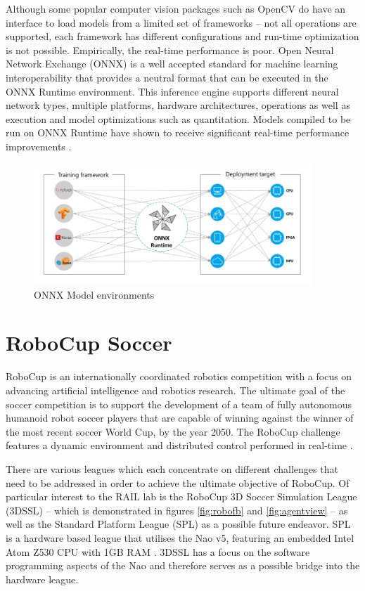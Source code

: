 \documentclass[a4paper,twoside,12pt]{report}
\begin{document}
Although some popular computer vision packages such as OpenCV do have an interface to load models from a limited set of frameworks -- not all operations are supported, each framework has different configurations and run-time optimization is not possible. Empirically, the real-time performance is poor. Open Neural Network Exchange (ONNX) is a well accepted standard \citep{onnx} for machine learning interoperability that provides a neutral format that can be executed in the ONNX Runtime environment. This inference engine supports different neural network types, multiple platforms, hardware architectures, operations as well as execution and model optimizations such as quantitation. Models compiled to be run on ONNX Runtime have shown to receive significant real-time performance improvements \citep{inference}.

\begin{figure}[h!]
\begin{center}
\includegraphics[width=10.5cm]{images/onnx.jpg}
\caption{ONNX Model environments \citep{onnx}}
\label{fig:onnxplot}
\end{center}
\end{figure}

\section{RoboCup Soccer}
RoboCup is an internationally coordinated robotics competition with a focus on advancing artificial intelligence and robotics research. The ultimate goal of the soccer competition is to support the development of a team of fully autonomous humanoid robot soccer players that are capable of winning against the winner of the most recent soccer World Cup, by the year 2050. The RoboCup challenge features a dynamic environment and distributed control performed in real-time \citep{RoboCupObj}.\

There are various leagues which each concentrate on different challenges that need to be addressed in order to achieve the ultimate objective of RoboCup. Of particular interest to the RAIL lab is the RoboCup 3D Soccer Simulation League (3DSSL) -- which is demonstrated in figures \ref{fig:robofb} and \ref{fig:agentview} -- as well as the Standard Platform League (SPL) as a possible future endeavor. SPL is a hardware based league that utilises the Nao v5, featuring an embedded Intel Atom Z530 CPU with 1GB RAM \citep{naov5}. 3DSSL has a focus on the software programming aspects of the Nao and therefore serves as a possible bridge into the hardware league.
\end{document}

